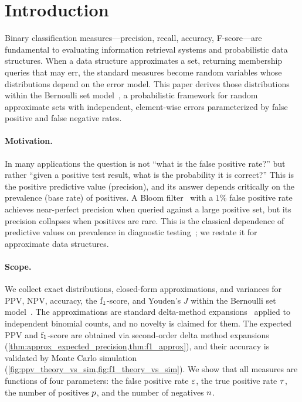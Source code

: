 
\section{Introduction}
\label{sec:intro}

Binary classification measures---precision, recall, accuracy, F-score---are fundamental to evaluating information retrieval systems and probabilistic data structures.
When a data structure approximates a set, returning membership queries that may err, the standard measures become random variables whose distributions depend on the error model.
This paper derives those distributions within the Bernoulli set model~\cite{bernoulliSets}, a probabilistic framework for random approximate sets with independent, element-wise errors parameterized by false positive and false negative rates.

\paragraph{Motivation.}
In many applications the question is not ``what is the false positive rate?'' but rather ``given a positive test result, what is the probability it is correct?''
This is the positive predictive value (precision), and its answer depends critically on the prevalence (base rate) of positives.
A Bloom filter~\cite{bf} with a $1\%$ false positive rate achieves near-perfect precision when queried against a large positive set, but its precision collapses when positives are rare. This is the classical dependence of predictive values on prevalence in diagnostic testing~\cite{altman1994predictive}; we restate it for approximate data structures.

\paragraph{Scope.}
We collect exact distributions, closed-form approximations, and variances for PPV, NPV, accuracy, the $\mathrm{f}_1$-score, and Youden's $J$ within the Bernoulli set model~\cite{bernoulliSets}.
The approximations are standard delta-method expansions~\cite{casellaBerger} applied to independent binomial counts, and no novelty is claimed for them.
The expected PPV and $\mathrm{f}_1$-score are obtained via second-order delta method expansions (\cref{thm:approx_expected_precision,thm:f1_approx}), and their accuracy is validated by Monte Carlo simulation (\cref{fig:ppv_theory_vs_sim,fig:f1_theory_vs_sim}).
We show that all measures are functions of four parameters: the false positive rate $\varepsilon$, the true positive rate $\tau$, the number of positives $p$, and the number of negatives $n$.

